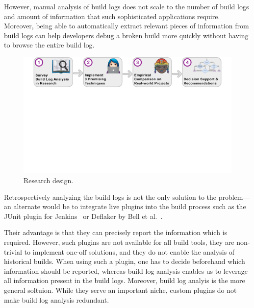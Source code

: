 However, manual analysis of build logs does not
scale to the number of build logs and amount of information that such
sophisticated applications require.
Moreover, being able to
automatically extract relevant pieces of information from build logs
can help
developers debug a broken build more quickly without having to browse
the entire build log.

\begin{figure}[htb]
	\centering
	\includegraphics[width=\textwidth, trim={1.2cm 10.5cm 1.2cm 0cm},
	clip]{img/overview.pdf}
	\caption{Research design.}
	\label{fig:overview}
\end{figure}


Retrospectively analyzing the build logs is not the only solution to
the problem---an alternate would be to integrate live plugins into the
build process
 such as the JUnit
plugin for Jenkins~\cite{jenkins2020junit-plugin} or
Deflaker by Bell et al.~\cite{bell2018deflaker}.

Their advantage is that they can precisely report the information which
is required.
However, such plugins are not available for all build tools, they are
non-trivial to implement one-off solutions, and they
do not enable the analysis of historical builds.
When using such a plugin, one has to decide
beforehand which information should be reported, whereas
build log analysis enables us to leverage all information
present in the build logs.
Moreover, build log analyis is the more general soltuion.
While they serve an important niche, custom plugins do not make build
log analysis redundant.

